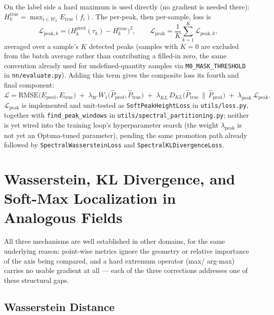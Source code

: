 \documentclass[11pt,a4paper]{article}
\begin{document}
On the label side a hard maximum is used directly (no gradient is needed
there): $H_k^{\text{true}} = \max_{i\in\mathcal{W}_k} E_{\text{true}}(f_i)$.
The per-peak, then per-sample, loss is
\begin{equation}
\mathcal{L}_{\text{peak},k} = \big(H_k^{\text{pred}}(\tau_k) -
H_k^{\text{true}}\big)^2, \qquad
\mathcal{L}_{\text{peak}} = \frac{1}{K}\sum_{k=1}^K \mathcal{L}_{\text{peak},k},
\end{equation}
averaged over a sample's $K$ detected peaks (samples with $K=0$ are excluded
from the batch average rather than contributing a filled-in zero, the same
convention already used for undefined-quantity samples via
\texttt{M0\_MASK\_THRESHOLD} in \texttt{nn/evaluate.py}). Adding this term
gives the composite loss its fourth and final component:
\begin{equation}
\mathcal{L} = \text{RMSE}\big(E_{\text{pred}}, E_{\text{true}}\big)
\;+\; \lambda_W\, W_1\big(\hat P_{\text{pred}}, \hat P_{\text{true}}\big)
\;+\; \lambda_{KL}\, D_{KL}\big(\hat P_{\text{true}}\,\|\,\hat P_{\text{pred}}\big)
\;+\; \lambda_{\text{peak}}\, \mathcal{L}_{\text{peak}}.
\end{equation}
$\mathcal{L}_{\text{peak}}$ is implemented and unit-tested as
\texttt{SoftPeakHeightLoss} in \texttt{utils/loss.py}, together with
\texttt{find\_peak\_windows} in \texttt{utils/spectral\_partitioning.py};
neither is yet wired into the training loop's hyperparameter search (the
weight $\lambda_{\text{peak}}$ is not yet an Optuna-tuned parameter), pending
the same promotion path already followed by
\texttt{SpectralWassersteinLoss} and \texttt{SpectralKLDivergenceLoss}.

\section{Wasserstein, KL Divergence, and Soft-Max Localization in Analogous Fields}
\label{sec:literature}

All three mechanisms are well established in other domains, for the same
underlying reason: point-wise metrics ignore the geometry or relative
importance of the axis being compared, and a hard extremum operator (max/
arg-max) carries no usable gradient at all — each of the three corrections
addresses one of these structural gaps.

\subsection{Wasserstein Distance}
\end{document}
